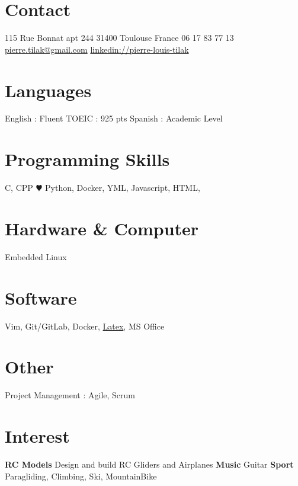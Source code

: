 \documentclass[a4paper]{friggeri-cv} %
\begin{document}


\begin{aside} %
\section{Contact}
115 Rue Bonnat apt 244
31400 Toulouse
France
06 17 83 77 13
~
\href{mailto:pierre.tilak@gmail.com}{pierre.tilak@gmail.com}
\href{https://www.linkedin.com/pub/pierre-louis-tilak/96/162/a83}{linkedin://pierre-louis-tilak}
\section{Languages}
English : Fluent
TOEIC : 925 pts 
Spanish : Academic Level\bigskip\bigskip
\section{Programming Skills}
C, CPP
{\color{red} $\varheartsuit$} Python, 
Docker, YML,
Javascript,
HTML,\bigskip\bigskip
\section{Hardware \& Computer}
Embedded Linux\bigskip\bigskip
\section{Software}
Vim, Git/GitLab, Docker, \href{https://github.com/tilaktilak/CV}{Latex}, MS Office\bigskip\bigskip
\section{Other}
Project Management : Agile, Scrum	\bigskip\bigskip
\section{Interest}
\textbf{RC Models} Design and build RC Gliders and Airplanes
\textbf{Music} Guitar
\textbf{Sport} Paragliding, Climbing, Ski, MountainBike
\end{aside}

\end{document}
